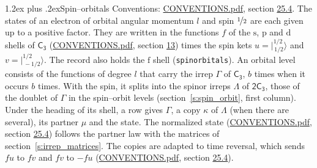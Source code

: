 \documentclass[10pt,a4paper]{article}
\makeatletter
\renewcommand\section{\@startsection{section}{1}{\z@}{-3ex plus -1ex minus -.2ex}%
  {1.2ex plus .2ex}{\normalfont\large\sffamily\bfseries\color{parttitle}}}
\numberwithin{equation}{section}
\newcommand{\grp}[1]{\mathsf{#1}}
\newcommand{\orbital}[1]{\mathrm{#1}}
\newcommand{\mult}{\kappa}
\newcommand{\intx}{\mu}
\newcommand{\jm}[2]{\bigl\lvert{}^{#1}_{\,#2}\bigr\rangle}
\makeatother
\begin{document}
\section{Spin--orbitals}\label{s:spin_orbitals}
Conventions: \href{../../CONVENTIONS.pdf}{CONVENTIONS.pdf}, section \href{../../CONVENTIONS.pdf\#conv.25.4}{25.4}.
\leavevmode\label{n:index.orbital.l}The states of an electron of orbital angular momentum $l$ and spin $\nicefrac{1}{2}$ are each given up to a positive factor. \label{n:local.spinor.uv}\label{n:local.function.f}They are written in the functions $f$ of the $\orbital{s}$, $\orbital{p}$ and $\orbital{d}$ shells of \href{../../../rotation/data/pdf/C3.pdf}{$\grp{C_{3}}$} (\href{../../CONVENTIONS.pdf}{CONVENTIONS.pdf}, section \href{../../../rotation/CONVENTIONS.pdf\#conv.13}{13}) times the spin kets $u = \jm{1/2}{1/2}$ and $v = \jm{1/2}{-1/2}$. The record also holds the $\orbital{f}$ shell (\texttt{spinorbitals}). An orbital level consists of the functions of degree $l$ that carry the irrep $\Gamma$ of \href{../../../rotation/data/pdf/C3.pdf}{$\grp{C_{3}}$}, $b$ times when it occurs $b$ times. With the spin, it splits into the spinor irreps $\Lambda$ of $\grp{2C_{3}}$, those of the doublet of $\Gamma$ in the spin--orbit levels (section~\ref{s:spin_orbit}, first column). \label{n:head.state}Under the heading of its shell, a row gives $\Gamma$, a copy $\mult$ of $\Lambda$ (when there are several), its partner $\intx$ and the state. The normalized state (\href{../../CONVENTIONS.pdf}{CONVENTIONS.pdf}, section \href{../../CONVENTIONS.pdf\#conv.25.4}{25.4}) follows the partner law with the matrices of section~\ref{s:irrep_matrices}. The copies are adapted to time reversal, which sends $f u$ to $f v$ and $f v$ to $-f u$ (\href{../../CONVENTIONS.pdf}{CONVENTIONS.pdf}, section \href{../../CONVENTIONS.pdf\#conv.25.4}{25.4}).
\end{document}
